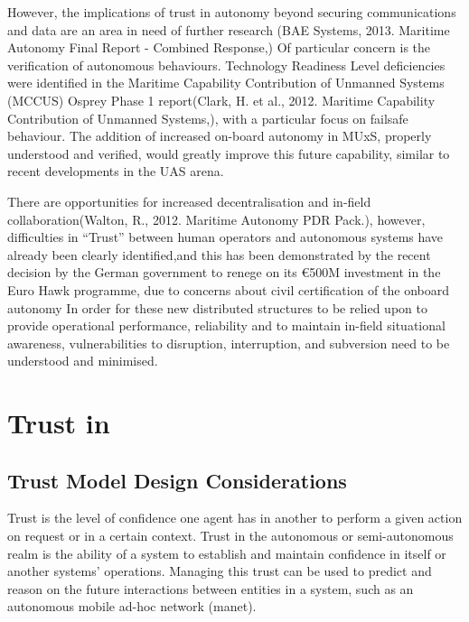 However, the implications of trust in autonomy beyond securing communications and data are an area in need of further research (BAE Systems, 2013. Maritime Autonomy Final Report - Combined Response,)
Of particular concern is the verification of autonomous behaviours.
Technology Readiness Level deficiencies were identified in the Maritime Capability Contribution of Unmanned Systems (MCCUS) Osprey Phase 1 report(Clark, H. et al., 2012. Maritime Capability Contribution of Unmanned Systems,), with a particular focus on failsafe behaviour.
The addition of increased on-board autonomy in MUxS, properly understood and verified, would greatly improve this future capability, similar to recent developments in the UAS arena\cite{Cummings2010}.

There are opportunities for increased decentralisation and in-field collaboration(Walton, R., 2012. Maritime Autonomy PDR Pack.), however, difficulties in “Trust” between human operators and autonomous systems have already been clearly identified\cite{Chen2011b},and this has been demonstrated by the recent decision by the German government to renege on its €500M investment in the Euro Hawk programme, due to concerns about civil certification of the onboard autonomy\cite{Mehta2013}
In order for these new distributed structures to be relied upon to provide operational performance, reliability and to maintain in-field situational awareness, vulnerabilities to disruption, interruption, and subversion need to be understood and minimised.


\section{Trust in }

\subsection{Trust Model Design Considerations}
Trust is the level of confidence one agent has in another to perform a given action on request or in a certain context.
Trust in the autonomous or semi-autonomous realm is the ability of a system to establish and maintain confidence in itself or another systems' operations.
Managing this trust can be used to predict and reason on the future interactions between entities in a system, such as an autonomous mobile ad-hoc network (\gls{manet}).

